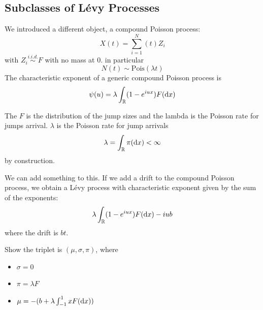 \documentclass{article}
\begin{document}
	\subsection{Subclasses of L\'evy Processes}
	We introduced a different object, a compound Poisson process:
	\begin{equation*}
		X(t) = \sum_{i=1}^N(t) Z_i
	\end{equation*}
	with $Z_i \stackrel{i.i.d.} \sim F$ with no mass at 0. in particular
	$$N(t) \sim \text{Pois}(\lambda t)$$
	The characteristic exponent of a generic compound Poisson process is 
	\begin{equation*}
		\psi(u) = \lambda \int_{\mathbb{R}} (1-e^{iux})F(\mathop{}\!\mathrm{d} x)
	\end{equation*}
	\begin{remark}
		The $F$ is the distribution of the jump sizes and the lambda is the Poisson rate for jumps arrival. 
		$\lambda$ is the Poisson rate for jump arrivals
		\begin{equation*}
			\lambda = \int_{\mathbb{R}} \pi(\mathop{}\!\mathrm{d} x) < \infty
		\end{equation*}
		by construction. 
	\end{remark}
	We can add something to this.
	If we add a drift to the compound Poisson process, we obtain a L\'evy process with characteristic exponent given by the sum of the exponents:
	\begin{equation*}
		\lambda \int_{\mathbb{R}} (1-e^{iux}) F(\mathop{}\!\mathrm{d} x) - iub
	\end{equation*}
	where the drift is $bt$. \\
	\begin{exercise}
		Show the triplet is $(\mu, \sigma, \pi)$, where
		\begin{itemize}
			\item $\sigma = 0$
			\item $\pi = \lambda F$
			\item $\mu = - (b+\lambda \int_{-1}^1 x F(\mathop{}\!\mathrm{d} x))$
		\end{itemize}
	\end{exercise}
\end{document}
